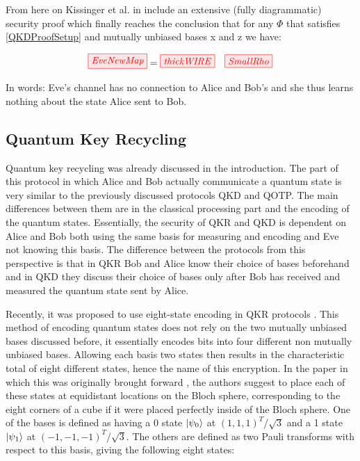 \documentclass[]{article}
\begin{document}
From here on Kissinger et al. in \cite{Kissinger2017} include an extensive (fully diagrammatic) security proof which finally reaches the conclusion that for any $\Phi$ that satisfies \ref{QKDProofSetup} and mutually unbiased bases x and z we have:

\begin{equation}
\tikzfig{EveNewMap} = \tikzfig{thickWIRE} ~~~ \tikzfig{SmallRho}
\end{equation}

In words: Eve's channel has no connection to Alice and Bob's and she thus learns nothing about the state Alice sent to Bob.


\subsection{Quantum Key Recycling}
\label{section:qkr}

Quantum key recycling was already discussed in the introduction. The part of this protocol in which Alice and Bob actually communicate a quantum state is very similar to the previously discussed protocols QKD and QOTP. The main differences between them are in the classical processing part and the encoding of the quantum states. Essentially, the security of QKR and QKD is dependent on Alice and Bob both using the same basis for measuring and encoding and Eve not knowing this basis. The difference between the protocols from this perspective is that in QKR Bob and Alice know their choice of bases beforehand and in QKD they discuss their choice of bases only after Bob has received and measured the quantum state sent by Alice.

Recently, it was proposed to use eight-state encoding in QKR protocols \cite{DeVries2016}. This method of encoding quantum states does not rely on the two mutually unbiased bases discussed before, it essentially encodes bits into four different non mutually unbiased bases. Allowing each basis two states then results in the characteristic total of eight different states, hence the name of this encryption. In the paper in which this was originally brought forward \cite{DeVries2016}, the authors suggest to place each of these states at equidistant locations on the Bloch sphere, corresponding to the eight corners of a cube if it were placed perfectly inside of the Bloch sphere. One of the bases is defined as having a 0 state $\ket{\psi_{0}}$ at $(1,1,1)^T$/$\sqrt{3}$ and a 1 state $\ket{\psi_{1}}$ at $(-1,-1,-1)^T$/$\sqrt{3}$. The others are defined as two Pauli transforms with respect to this basis, giving the following eight states:
\end{document}
